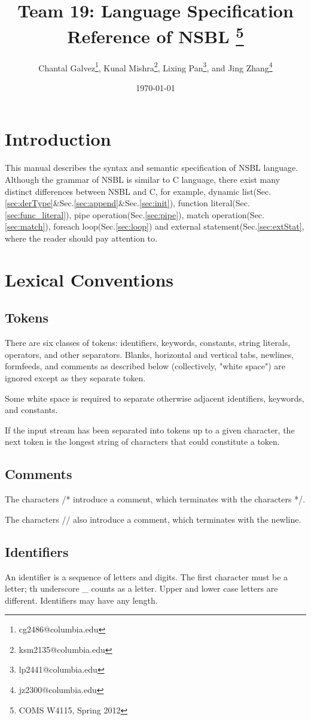 \documentclass[letterpaper,12pt]{article}
\title {Team 19: Language Specification Reference of NSBL
\footnote{COMS W4115, Spring 2012 }}
\author {
Chantal Galvez\footnote{cg2486@columbia.edu}, 
Kunal Mishra\footnote{ksm2135@columbia.edu}, 
Lixing Pan\footnote{lp2441@columbia.edu},
and Jing Zhang\footnote{jz2300@columbia.edu}}
\date{\today}
\begin{document}
\maketitle
\section{Introduction}
  This manual describes the syntax and semantic specification of NSBL language. Although the grammar of NSBL is similar to C language, there exist many distinct differences between NSBL and C, for example, 
dynamic list(Sec.\ref{sec:derType}\&Sec.\ref{sec:append}\&Sec.\ref{sec:init}), 
function literal(Sec.\ref{sec:func_literal}), 
pipe operation(Sec.\ref{sec:pipe}),
match operation(Sec.\ref{sec:match}),
foreach loop(Sec.\ref{sec:loop})
and external statement(Sec.\ref{sec:extStat},
 where the reader should pay attention to.  

\section{Lexical Conventions}
\subsection{Tokens}
There are six classes of tokens: identifiers, keywords, constants, string literals, operators, and other separators. Blanks, horizontal and vertical tabs, newlines, formfeeds, and comments as described below (collectively, "white space") are ignored except as they separate token. \newline

Some white space is required to separate otherwise adjacent identifiers, keywords, and constants. \newline

If the input stream has been separated into tokens up to a given character, the next token is the longest string of characters that could constitute a token.

\subsection{Comments}
  The characters /* introduce a comment, which terminates with the characters */.\newline

  The characters // also introduce a comment, which terminates with the newline.

\subsection{Identifiers}
An identifier is a sequence of letters and digits. The first character must be a letter; th underscore \_ counts as a letter. Upper and lower case letters are different. Identifiers may have any length.
\end{document}

